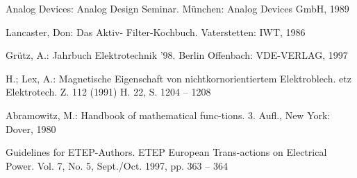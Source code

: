 \documentclass[10pt,a4paper,oneside,abstracton]{scrartcl}
\begin{document}
\begin{multicols}{2}
\begin{thebibliography}{9}
			
			
			
			
			
			Analog Devices: Analog Design		Seminar.
			München: Analog Devices GmbH,
			1989
			
			
			
			Lancaster, Don: Das Aktiv-			Filter-Kochbuch. Vaterstetten:  	IWT, 1986 
			
			
			Grütz, A.: Jahrbuch 				Elektrotechnik ’98. Berlin 			Offenbach: VDE-VERLAG, 				1997
			
			H.; Lex, A.: Magnetische 			Eigenschaft von 					nichtkornorientiertem 				Elektroblech. etz Elektrotech. 	Z. 112 (1991) H. 22, S. 1204 – 	1208
			
			Abramowitz, M.: Handbook of 		mathematical func-tions. 3. 			Aufl., New York: Dover, 1980
			
			Guidelines for ETEP-Authors. 		ETEP European Trans-actions on 	Electrical Power. Vol. 7, No. 		5, Sept./Oct. 1997, pp. 363 – 		364
			
		\end{thebibliography}
		
	\end{multicols}
	
	
\end{document}
